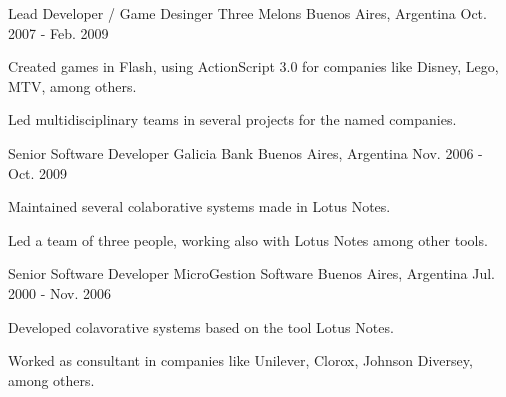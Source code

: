 \begin{cventries}
  \cventry
    {Lead Developer / Game Desinger} %
    {Three Melons} %
    {Buenos Aires, Argentina} %
    {Oct. 2007 - Feb. 2009} %
    {
      \begin{cvitems} %
        \item {Created games in Flash, using ActionScript 3.0 for companies like Disney, Lego, MTV, among others.}
        \item {Led multidisciplinary teams in several projects for the named companies.}
      \end{cvitems}
    }

  \cventry
    {Senior Software Developer} %
    {Galicia Bank} %
    {Buenos Aires, Argentina} %
    {Nov. 2006 - Oct. 2009} %
    {
      \begin{cvitems} %
        \item {Maintained several colaborative systems made in Lotus Notes.}
        \item {Led a team of three people, working also with Lotus Notes among other tools.}
      \end{cvitems}
    }

  \cventry
    {Senior Software Developer} %
    {MicroGestion Software} %
    {Buenos Aires, Argentina} %
    {Jul. 2000 - Nov. 2006} %
    {
      \begin{cvitems} %
        \item {Developed colavorative systems based on the tool Lotus Notes.}
        \item {Worked as consultant in companies like Unilever, Clorox, Johnson Diversey, among others.}
      \end{cvitems}
    }

\end{cventries}

